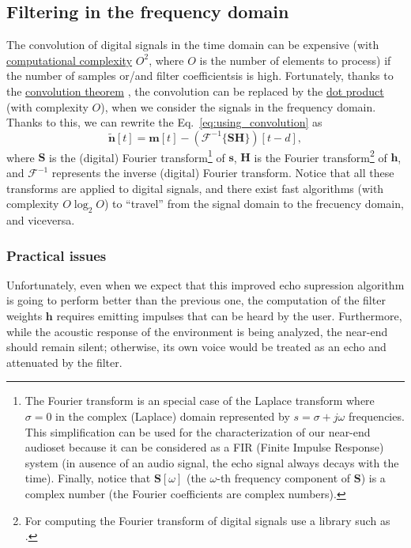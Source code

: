 \subsection{Filtering in the frequency domain}
The convolution of digital signals in the time domain can be expensive
(with
\href{https://en.wikipedia.org/wiki/Computational_complexity_theory}{computational
  complexity} $O^2$, where $O$ is the number of elements to process)
if the number of samples or/and filter coefficientsis is
high. Fortunately, thanks to the
\href{https://en.wikipedia.org/wiki/Convolution}{convolution theorem}
\cite{kovacevic2013fourier,Oppenheim2}, the convolution can be
replaced by the \href{https://en.wikipedia.org/wiki/Dot_product}{dot
  product} (with complexity $O$), when we consider the signals in the
frequency domain. Thanks to this, we can rewrite the
Eq.~\eqref{eq:using_convolution} as
\begin{equation}
  \tilde{\mathbf n}[t] = {\mathbf m}[t] - ({\mathcal F}^{-1}\{{\mathbf S}{\mathbf H}\})[t-d],
  \label{eq:faster}
\end{equation}
where ${\mathbf S}$ is the (digital) Fourier transform\footnote{The
Fourier transform is an special case of the Laplace transform where
$\sigma=0$ in the complex (Laplace) domain represented by
$s=\sigma+j\omega$ frequencies. This simplification can be used for
the characterization of our near-end audioset because it can be
considered as a FIR (Finite Impulse Response) system (in ausence of an
audio signal, the echo signal always decays with the time). Finally,
notice that ${\mathbf S}[\omega]$ (the $\omega$-th frequency component
of ${\mathbf S}$) is a complex number (the Fourier coefficients are
complex numbers).} of ${\mathbf s}$, ${\mathbf H}$ is the Fourier
transform\footnote{For computing the Fourier transform of digital
signals use a library such as
\href{https://numpy.org/doc/2.1/reference/routines.fft.html}{}.}
of ${\mathbf h}$, and ${\mathcal F}^{-1}$ represents the inverse
(digital) Fourier transform. Notice that all these transforms are
applied to digital signals, and there exist fast algorithms (with
complexity $O\log_2O$) to ``travel'' from the signal domain to the
frecuency domain, and viceversa.

\subsubsection*{Practical issues}
Unfortunately, even when we expect that this improved echo
supression algorithm is going to perform better than the previous one,
the computation of the filter weights ${\mathbf h}$ requires emitting
impulses that can be heard by the user. Furthermore, while the
acoustic response of the environment is being analyzed, the near-end
should remain silent; otherwise, its own voice would be treated as an
echo and attenuated by the filter.

